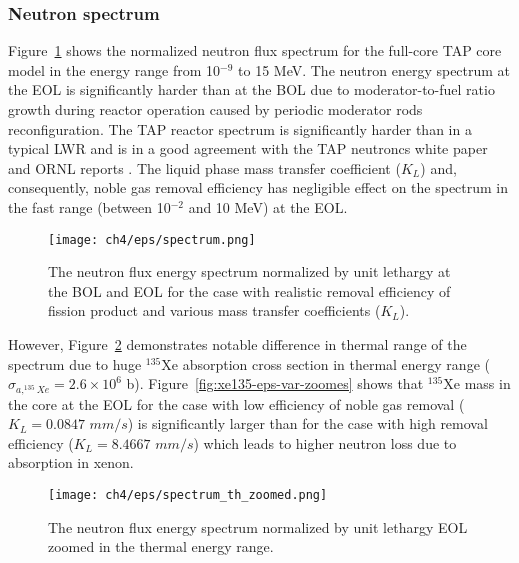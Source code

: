 \subsubsection{Neutron spectrum}
Figure~\ref{fig:spectrum-eps-var} shows the normalized neutron flux spectrum 
for the full-core TAP core model
in the energy range from 10$^{-9}$ to 15 MeV. 
The neutron energy spectrum at the \gls{EOL} is
significantly harder than at 
the \gls{BOL} due to moderator-to-fuel ratio growth during reactor operation 
caused by periodic moderator rods reconfiguration. The \gls{TAP} reactor 
spectrum is significantly harder
than in a typical \gls{LWR} and is in a good 
agreement with the \gls{TAP} neutroncs white paper 
\cite{transatomic_power_corporation_neutronics_2016} and ORNL 
reports \cite{betzler_assessment_2017-1, betzler_two-dimensional_2017}.
The 
liquid phase mass transfer coefficient ($K_L$) and, consequently, noble gas 
removal efficiency has negligible effect on the spectrum in the fast range 
(between 10$^{-2}$ and 10 MeV) at the \gls{EOL}. 
\begin{figure}[htp!] %
	\centering
	\texttt{[image: ch4/eps/spectrum.png]}
		\vspace{-3mm}
	\caption{The neutron flux energy spectrum normalized by unit lethargy at 
		the \gls{BOL} and \gls{EOL}	for the case with realistic removal 
		efficiency of fission product and various mass transfer coefficients 
		($K_L$).}
	\label{fig:spectrum-eps-var}
\end{figure}

However, Figure~\ref{fig:spectrum-th-eps-var} demonstrates notable difference 
in thermal range of the spectrum due to huge $^{135}$Xe absorption 
cross section in thermal energy range ($\sigma_{a,^{135}Xe}=2.6\times10^6$ 
b). Figure~\ref{fig:xe135-eps-var-zoomes} shows that $^{135}$Xe mass in the 
core at the \gls{EOL} for the case with low efficiency of noble gas removal 
($K_L=0.0847$ $mm/s$) is significantly larger than for the case with high 
removal efficiency ($K_L=8.4667$ $mm/s$) which leads to higher neutron loss 
due to absorption in xenon.
\begin{figure}[htp!] %
	\centering
	\texttt{[image: ch4/eps/spectrum\_th\_zoomed.png]}
			\vspace{-3mm}
	\caption{The neutron flux energy spectrum normalized by unit lethargy  
		\gls{EOL} zoomed in the thermal energy range.}
	\label{fig:spectrum-th-eps-var}
\end{figure}


